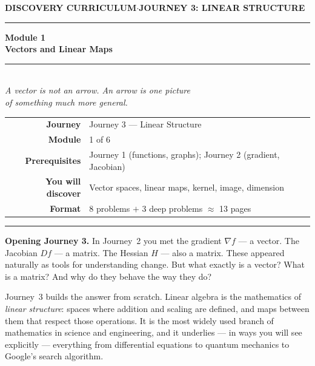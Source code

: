 \documentclass[12pt, a4paper]{article}
\newcounter{problem}
\begin{document}

\thispagestyle{empty}
\begin{center}
{\small\color{MidBlue}\textbf{DISCOVERY CURRICULUM}\quad$\cdot$\quad\textbf{JOURNEY 3: LINEAR STRUCTURE}}

\vspace{0.6cm}
{\color{NavyBlue}\rule{\linewidth}{2pt}}
\vspace{0.5cm}

{\Huge\bfseries\color{NavyBlue}Module 1}\\[0.3cm]
{\LARGE\bfseries\color{MidBlue}Vectors and Linear Maps}\\[0.4cm]
{\color{Gold}\rule{0.4\linewidth}{1.2pt}}\\[0.4cm]
{\large\itshape\color{DarkGrey}
A vector is not an arrow. An arrow is one picture\\[0.15cm]
of something much more general.}

\vspace{1cm}
\begin{tabular}{rl}
\color{DarkGrey}\textbf{Journey}           & Journey 3 --- Linear Structure \\[4pt]
\color{DarkGrey}\textbf{Module}            & 1 of 6 \\[4pt]
\color{DarkGrey}\textbf{Prerequisites}     & Journey 1 (functions, graphs); Journey 2 (gradient, Jacobian) \\[4pt]
\color{DarkGrey}\textbf{You will discover} & Vector spaces, linear maps, kernel, image, dimension \\[4pt]
\color{DarkGrey}\textbf{Format}            & 8 problems $+$ 3 deep problems $\approx$ 13 pages \\
\end{tabular}

\vspace{1cm}
{\color{NavyBlue}\rule{\linewidth}{2pt}}
\end{center}

\vspace{0.5cm}

\noindent\textbf{Opening Journey 3.}
In Journey~2 you met the gradient $\nabla f$ --- a vector. The Jacobian $Df$ --- a matrix. The Hessian $H$ --- also a matrix. These appeared naturally as tools for understanding change. But what exactly is a vector? What is a matrix? And why do they behave the way they do?

\medskip
Journey~3 builds the answer from scratch. Linear algebra is the mathematics of \emph{linear structure}: spaces where addition and scaling are defined, and maps between them that respect those operations. It is the most widely used branch of mathematics in science and engineering, and it underlies --- in ways you will see explicitly --- everything from differential equations to quantum mechanics to Google's search algorithm.
\end{document}

